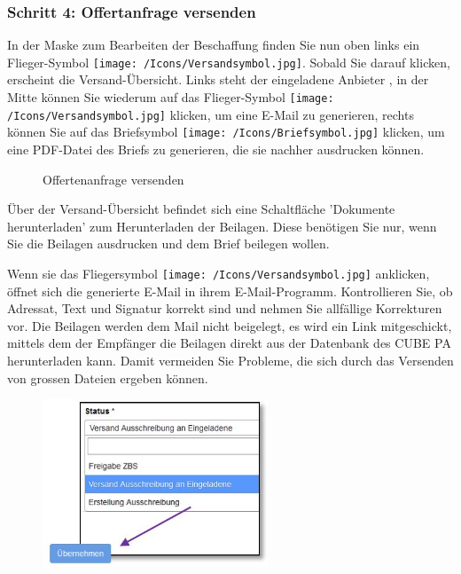 \subsubsection{Schritt 4: Offertanfrage versenden}

In der Maske zum Bearbeiten der Beschaffung finden Sie nun oben links ein Flieger-Symbol \texttt{[image: /Icons/Versandsymbol.jpg]}. Sobald Sie darauf klicken, erscheint die Versand-Übersicht. Links steht der eingeladene Anbieter , in der Mitte können Sie wiederum auf das Flieger-Symbol \texttt{[image: /Icons/Versandsymbol.jpg]}  klicken, um eine E-Mail zu generieren, rechts können Sie auf das Briefsymbol \texttt{[image: /Icons/Briefsymbol.jpg]}  klicken, um eine PDF-Datei des Briefs zu generieren, die sie nachher ausdrucken können.

\begin{figure}[H]
\caption{Offertenanfrage versenden}
\end{figure}

Über der Versand-Übersicht befindet sich eine Schaltfläche 'Dokumente herunterladen'  zum Herunterladen der Beilagen. Diese benötigen Sie nur, wenn Sie die Beilagen ausdrucken und dem Brief beilegen wollen.

\vspace{\baselineskip}

Wenn sie das Fliegersymbol \texttt{[image: /Icons/Versandsymbol.jpg]} anklicken, öffnet sich die generierte E-Mail in ihrem E-Mail-Programm. Kontrollieren Sie, ob Adressat, Text und Signatur korrekt sind und nehmen Sie allfällige Korrekturen vor. Die Beilagen werden dem Mail nicht beigelegt, es wird ein Link mitgeschickt, mittels dem der Empfänger die Beilagen direkt aus der Datenbank des CUBE PA herunterladen kann. Damit vermeiden Sie Probleme, die sich durch das Versenden von grossen Dateien ergeben können.

\begin{figure}
\vspace{-25pt}
\includegraphics[height=50mm]{../chapters/08_Beschaffungswesen/pictures/7-1-4_BeschaffungEingeladene.jpg}
\end{figure}

